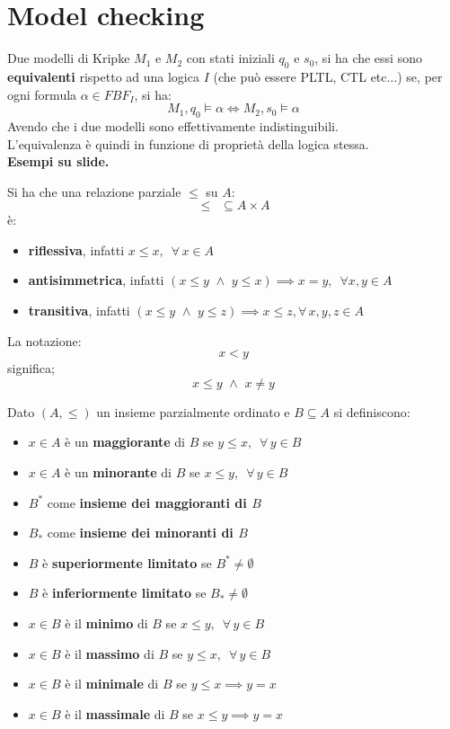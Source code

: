 \section{Model checking}
\begin{definizione}
  Due modelli di Kripke $M_1$ e $M_2$ con stati iniziali $q_0$ e $s_0$, si ha
  che essi sono \textbf{equivalenti} rispetto ad una logica $I$ (che può essere
  PLTL, CTL etc$\ldots$) se, per ogni formula $\alpha\in FBF_I$, si ha:
  \[M_1, q_0\vDash \alpha\iff M_2, s_0\vDash \alpha\]
  Avendo che i due modelli sono effettivamente indistinguibili.\\
  L'equivalenza è quindi in funzione di proprietà della logica stessa.\\
  \textbf{Esempi su slide.}
\end{definizione}
\begin{definizione}
  Si ha che una relazione parziale $\leq$ su $A$:
  \[\leq\,\,\, \subseteq A\times A\]
  è:
  \begin{itemize}
    \item \textbf{riflessiva}, infatti $x\leq x,\,\,\,\forall\, x\in A$ 
    \item \textbf{antisimmetrica}, infatti $(x\leq y\,\,\land\,\, y\leq
    x)\implies  x=y,\,\,\,\forall x, y\in A$
    \item \textbf{transitiva}, infatti $(x\leq y\,\,\land\,\, y\leq z)\implies
    x\leq z,\forall\, x, y, z\in A$
  \end{itemize}
  La notazione:
  \[x<y\]
  significa;
  \[x\leq y\,\,\land\,\, x\neq y\]
\end{definizione}
\begin{definizione}
  Dato $(A,\leq)$ un insieme parzialmente ordinato e $B\subseteq A$ si
  definiscono:
  \begin{itemize}
    \item $x\in A$ è un \textbf{maggiorante} di $B$ se $y\leq
    x,\,\,\,\forall\, y\in B$
    \item $x\in A$ è un \textbf{minorante} di $B$ se $x\leq
    y,\,\,\,\forall\, y\in B$
    \item $B^*$ come \textbf{insieme dei maggioranti di $B$}
    \item $B_*$ come \textbf{insieme dei minoranti di $B$}
    \item $B$ è \textbf{superiormente limitato} se $B^*\neq \emptyset$
    \item $B$ è \textbf{inferiormente limitato} se $B_*\neq \emptyset$
    \item $x\in B$ è il \textbf{minimo} di $B$ se $x\leq y,\,\,\,\forall\, y\in
    B$ 
    \item $x\in B$ è il \textbf{massimo} di $B$ se $y\leq x,\,\,\,\forall\, y\in
    B$
    \item $x\in B$ è il \textbf{minimale} di $B$ se $y\leq x\implies y=x$
    \item $x\in B$ è il \textbf{massimale} di $B$ se $x\leq y\implies y=x$
  \end{itemize}
\end{definizione}
